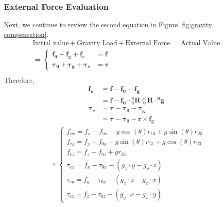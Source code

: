 \subsubsection{External Force Evaluation}
Next, we continue to review the second equation in  Figure \ref{fig:gravity compensation}.
\begin{equation}
\begin{split}
\text{Initial value}	+ \text{Gravity Load} 		+ \text{External Force}		&= \text{Actual Value} \\
\Rightarrow \left\{\begin{matrix}
\boldsymbol{f_0}		+\boldsymbol{f_g}		+\boldsymbol{f_e}		&= \boldsymbol{f}\\ 
\boldsymbol{\tau_0}		+\boldsymbol{\tau_g}	+\boldsymbol{\tau_e}		&= \boldsymbol{\tau}	
\end{matrix}\right.	\\
\end{split}
\end{equation}
Therefore,
\begin{equation}
\begin{split}
\boldsymbol{f_e}		&= \boldsymbol{f} 		- \boldsymbol{f_0}		-\boldsymbol{f_g}\\
						&= \boldsymbol{f} 		- \boldsymbol{f_0}		- ^\mathrm{S}_6\mathbf{R} \cdot ^6_0\!\mathbf{R} \cdot \boldsymbol{^0\!g}\\
\boldsymbol{\tau_e}		&= \boldsymbol{\tau}	- \boldsymbol{\tau_0}		-\boldsymbol{\tau_g}\\
						&= \boldsymbol{\tau}	- \boldsymbol{\tau_0}		-\boldsymbol{r} \times \boldsymbol{f_g}
\end{split}
\end{equation}
\begin{equation*}
\begin{split}
\Rightarrow 
\left\{\begin{matrix}
f_{ex} = f_x - f_{0x} 	+ g\cos(\theta)r_{13} 	+ g\sin(\theta)r_{23}\\
f_{ey} = f_y - f_{0y} 	- g\sin(\theta)r_{13} 	+ g\cos(\theta)r_{23}\\
f_{ez} = f_z - f_{0z} 	+ gr_{33}\\
\tau_{ex} = f_x - \tau_{0x} - \left( g_z\cdot y - g_y\cdot z \right)\\
\tau_{ey} = f_y - \tau_{0y} - \left( g_x\cdot z - g_z\cdot x \right)\\
\tau_{ez} = f_z - \tau_{0z} - \left( g_y\cdot x - g_x\cdot y \right)
\end{matrix}\right.
\end{split}
\end{equation*}
